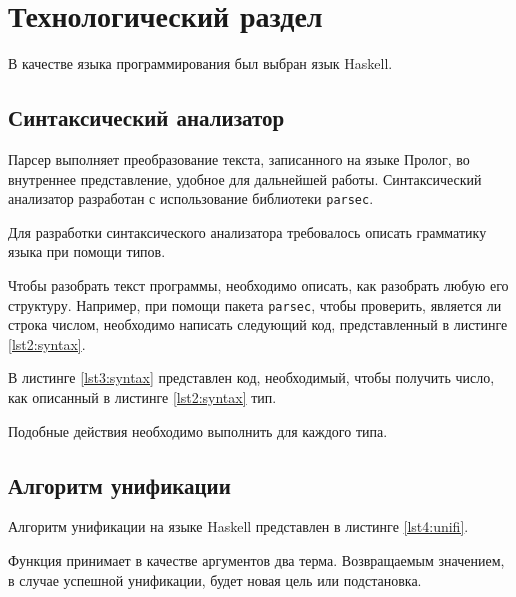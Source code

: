 \chapter{Технологический раздел}

В качестве языка программирования был выбран язык Haskell.  

\section{Синтаксический анализатор}
Парсер выполняет преобразование текста, записанного на языке Пролог, во внутреннее представление, удобное для дальнейшей работы. Синтаксический анализатор разработан с использование библиотеки \texttt{parsec}.

Для разработки синтаксического анализатора требовалось описать грамматику языка при помощи типов.



Чтобы разобрать текст программы, необходимо описать, как разобрать любую его структуру. Например, при помощи пакета \texttt{parsec}, чтобы проверить, является ли строка числом, необходимо написать следующий код, представленный в листинге \ref{lst2:syntax}.



В листинге \ref{lst3:syntax} представлен код, необходимый, чтобы получить число, как описанный в листинге \ref{lst2:syntax} тип.



Подобные действия необходимо выполнить для каждого типа.

\section{Алгоритм унификации}
Алгоритм унификации на языке Haskell представлен в листинге \ref{lst4:unifi}.


Функция принимает в качестве аргументов два терма. Возвращаемым значением, в случае успешной унификации, будет новая цель или подстановка.

